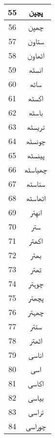 \begin{longtable}[c]{|c|c|}
55              & \texturdu{پچپن}     \\ \hline
56              & \texturdu{چھپن}     \\ \hline
57              & \texturdu{ستاون}    \\ \hline
58              & \texturdu{اٹھاون}   \\ \hline
59              & \texturdu{انسٹھ}    \\ \hline
60              & \texturdu{ساٹھ}     \\ \hline
61              & \texturdu{اکسٹھ}    \\ \hline
62              & \texturdu{باسٹھ}    \\ \hline
63              & \texturdu{تریسٹھ}   \\ \hline
64              & \texturdu{چونسٹھ }  \\ \hline
65              & \texturdu{پینسٹھ}   \\ \hline
66              & \texturdu{چھیاسٹھ}  \\ \hline
67              & \texturdu{ستاسٹھ}   \\ \hline
68              & \texturdu{اٹھاسٹھ}  \\ \hline
69              & \texturdu{انهتر}    \\ \hline
70              & \texturdu{ستر}      \\ \hline
71              & \texturdu{اکھتر}    \\ \hline
72              & \texturdu{بھتر}     \\ \hline
73              & \texturdu{تھتر}     \\ \hline
74              & \texturdu{چوہتر}    \\ \hline
75              & \texturdu{پچھتر}    \\ \hline
76              & \texturdu{چھہتر}    \\ \hline
77              & \texturdu{ستتر}     \\ \hline
78              & \texturdu{اٹھتر}    \\ \hline
79              & \texturdu{اناسی}    \\ \hline
80              & \texturdu{اسی}      \\ \hline
81              & \texturdu{اکاسی}    \\ \hline
82              & \texturdu{بیاسی}    \\ \hline
83              & \texturdu{تراسی}    \\ \hline
84              & \texturdu{چوراسی}   \\ \hline

\end{longtable}
